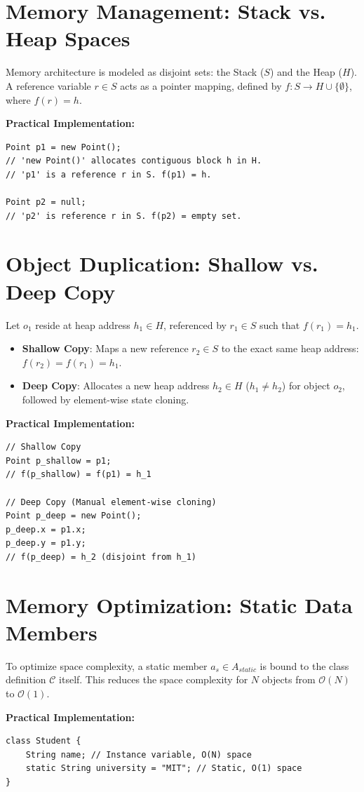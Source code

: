 \documentclass[10pt,journal,compsoc]{IEEEtran}
\begin{document}
\section{Memory Management: Stack vs. Heap Spaces}
Memory architecture is modeled as disjoint sets: the Stack ($S$) and the Heap ($H$).
A reference variable $r \in S$ acts as a pointer mapping, defined by $f: S \to H \cup \{\emptyset\}$, where $f(r) = h$.

\textbf{Practical Implementation:}
\begin{verbatim}
Point p1 = new Point(); 
// 'new Point()' allocates contiguous block h in H.
// 'p1' is a reference r in S. f(p1) = h.

Point p2 = null; 
// 'p2' is reference r in S. f(p2) = empty set.
\end{verbatim}

\section{Object Duplication: Shallow vs. Deep Copy}
Let $o_1$ reside at heap address $h_1 \in H$, referenced by $r_1 \in S$ such that $f(r_1) = h_1$.
\begin{itemize}
\item \textbf{Shallow Copy}: Maps a new reference $r_2 \in S$ to the exact same heap address: $f(r_2) = f(r_1) = h_1$.
\item \textbf{Deep Copy}: Allocates a new heap address $h_2 \in H$ ($h_1 \neq h_2$) for object $o_2$, followed by element-wise state cloning.
\end{itemize}

\textbf{Practical Implementation:}
\begin{verbatim}
// Shallow Copy
Point p_shallow = p1; 
// f(p_shallow) = f(p1) = h_1

// Deep Copy (Manual element-wise cloning)
Point p_deep = new Point();
p_deep.x = p1.x;
p_deep.y = p1.y;
// f(p_deep) = h_2 (disjoint from h_1)
\end{verbatim}

\section{Memory Optimization: Static Data Members}
To optimize space complexity, a static member $a_s \in A_{static}$ is bound to the class definition $\mathcal{C}$ itself. This reduces the space complexity for $N$ objects from $\mathcal{O}(N)$ to $\mathcal{O}(1)$.

\textbf{Practical Implementation:}
\begin{verbatim}
class Student {
    String name; // Instance variable, O(N) space
    static String university = "MIT"; // Static, O(1) space
}
\end{verbatim}
\end{document}
